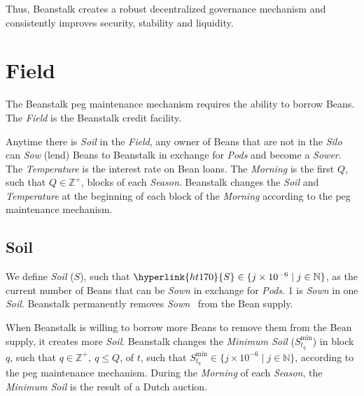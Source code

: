 \documentclass[tikz]{article}
\newcommand{\term}[1]{\textsl{#1}}
\newcommand{\Bean}{} %
\begin{document}
Thus, Beanstalk creates a robust decentralized governance mechanism and consistently improves security, stability and liquidity.


\section{Field}
\vspace*{-1mm}

The Beanstalk peg maintenance mechanism requires the ability to borrow Beans. The \term{Field} is the Beanstalk credit facility. 

Anytime there is \term{Soil} in the \term{Field}, any owner of Beans that are not in the \term{Silo} can \term{Sow} (lend) Beans to Beanstalk in exchange for \term{Pods} and become a \term{Sower}. The \term{Temperature} is the interest rate on Bean loans. The \term{Morning} is the first $Q$, such that ${Q} \in \mathbb{Z}^{+}$, blocks of each \term{Season}. Beanstalk changes the \term{Soil} and \term{Temperature} at the beginning of each block of the \term{Morning} according to the peg maintenance mechanism.


\vspace*{-2mm}
\subsection{Soil}
\vspace*{-2mm}

We define \term{Soil} (\hyperlink{ht170}{$S$}), such that $\hyperlink{ht170}{S} \in \{j \times 10^{-6} \mid j \in \mathbb{N} \}$, as the current number of Beans that can be \term{Sown} in exchange for \term{Pods}. \Bean1 is \term{Sown} in one \term{Soil}. Beanstalk permanently removes \term{Sown} \Bean\ from the Bean supply. 

When Beanstalk is willing to borrow more Beans to remove them from the Bean supply, it creates more \term{Soil}. Beanstalk changes the \term{Minimum Soil} ($S_{t_q}^{\text{min}}$) in block $q$, such that $q \in \mathbb{Z}^{+},\ q \leq Q$, of $t$, such that $S_{t_q}^{\text{min}} \in \{j \times 10^{-6} \mid j \in \mathbb{N} \}$, according to the peg maintenance mechanism. During the \term{Morning} of each \term{Season}, the \term{Minimum Soil} is the result of a Dutch auction.

\end{document}

